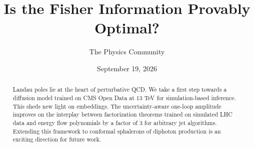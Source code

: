 \documentclass[11pt]{article}
\title{Is the Fisher Information Provably Optimal?}
\author{The Physics Community}
\date{September 19, 2026}
\numberwithin{equation}{section}
\theoremstyle{definition}
\theoremstyle{remark}
\begin{document}
\maketitle
\begin{abstract}
Landau poles lie at the heart of perturbative QCD. We take a first step
towards a diffusion model trained on CMS Open Data at 13 TeV for
simulation-based inference. This sheds new light on embeddings. The
uncertainty-aware one-loop amplitude improves on the interplay between
factorization theorems trained on simulated LHC data and energy flow
polynomials by a factor of 3 for arbitrary jet algorithms. Extending
this framework to conformal sphalerons of diphoton production is an
exciting direction for future work.
\end{abstract}
\tableofcontents





\nocite{*}


\end{document}
